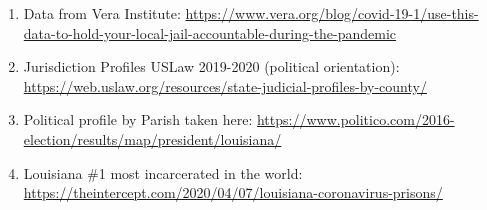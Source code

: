 \documentclass[
]{article}
\begin{document}
\begin{enumerate}
\def\labelenumi{(\arabic{enumi})}
\item
  Data from Vera Institute:
  \url{https://www.vera.org/blog/covid-19-1/use-this-data-to-hold-your-local-jail-accountable-during-the-pandemic}
\item
  Jurisdiction Profiles USLaw 2019-2020 (political orientation):
  \url{https://web.uslaw.org/resources/state-judicial-profiles-by-county/}
\item
  Political profile by Parish taken here:
  \url{https://www.politico.com/2016-election/results/map/president/louisiana/}
\item
  Louisiana \#1 most incarcerated in the world:
  \url{https://theintercept.com/2020/04/07/louisiana-coronavirus-prisons/}
\end{enumerate}
\end{document}
